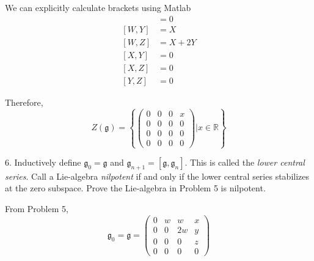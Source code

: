 \documentclass[12pt]{article}
\newcommand{\R}{\mathbb{R}}
\newcommand{\g}{\mathfrak{g}}
\begin{document}
        We can explicitly calculate brackets using Matlab
        \begin{align*}
            [W, X] &= 0\\
            [W, Y] &= X\\ 
            [W, Z] &= X + 2Y\\
            [X, Y] &= 0\\
            [X, Z] &= 0\\ 
            [Y, Z] &= 0
        \end{align*}

        Therefore, 
        \[\boxed{Z(\g) = \left\{\begin{pmatrix}
            0 & 0 & 0 & x\\ 
            0 & 0 & 0 & 0\\
            0 & 0 & 0 & 0\\
            0 & 0 & 0 & 0
        \end{pmatrix} \bigg\vert x \in \R \right\}}\]
    \color{black}
     
\pagebreak

6.  Inductively define $\g_{0} = \g$ and $\g_{n+1} = [\g,\g_{n}]$.  This is called the \emph{lower central series}.  Call a Lie-algebra \emph{nilpotent} if and only if the lower central series stabilizes at the zero subspace.  Prove the Lie-algebra in Problem 5 is nilpotent.

    \color{blue}
        From Problem 5, 
        \[\g_0 = \g = \begin{pmatrix}
            0 & w & w & x\\ 
            0 & 0 & 2w & y\\
            0 & 0 & 0 & z\\
            0 & 0 & 0 & 0
        \end{pmatrix}\]
\end{document}
